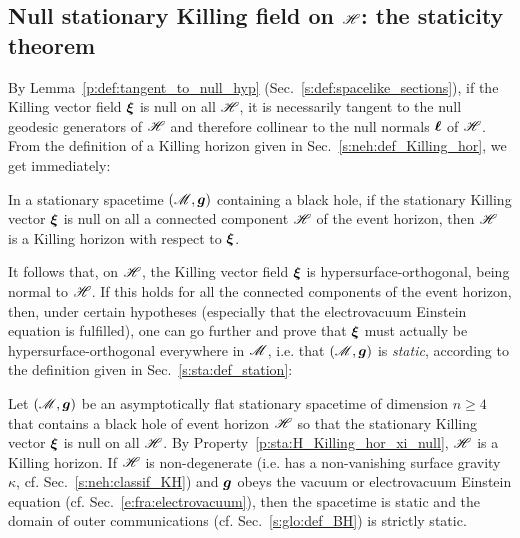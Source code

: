 \subsection{Null stationary Killing field on $\mathscr{H}$: the staticity theorem}\label{s:sta:staticity_thm}

By Lemma~\ref{p:def:tangent_to_null_hyp} (Sec.~\ref{s:def:spacelike_sections}),
if the Killing vector
field $\bm{\xi}$ is null on all $\mathscr{H}$, it is necessarily tangent to the null geodesic generators
of $\mathscr{H}$ and therefore collinear to the null normals $\bm{\ell}$ of $\mathscr{H}$. From the definition
of a Killing horizon
given in Sec.~\ref{s:neh:def_Killing_hor}, we get immediately:

\begin{prop}
\label{p:sta:H_Killing_hor_xi_null}
In a stationary spacetime $(\mathscr{M},\bm{g})$ containing a black hole,
if the stationary Killing vector $\bm{\xi}$
is null on all a connected component $\mathscr{H}$ of the event horizon, then $\mathscr{H}$ is a Killing horizon with respect to $\bm{\xi}$.
\end{prop}

It follows that, on $\mathscr{H}$, the Killing vector field $\bm{\xi}$
is hypersurface-orthogonal, being normal to $\mathscr{H}$.
If this holds for all the connected components of the event horizon, then,
under certain hypotheses (especially
that the electrovacuum Einstein equation is fulfilled), one can go further
and prove that $\bm{\xi}$ must actually be hypersurface-orthogonal everywhere in $\mathscr{M}$,
i.e. that $(\mathscr{M},\bm{g})$ is \emph{static}, according to the definition given in Sec.~\ref{s:sta:def_station}:

\begin{prop}
\label{p:sta:staticity_thm}
Let $(\mathscr{M},\bm{g})$ be an asymptotically flat stationary spacetime of dimension $n\geq 4$
that contains a black hole of event horizon $\mathscr{H}$ so that
the stationary Killing vector $\bm{\xi}$ is null on all $\mathscr{H}$. By Property~\ref{p:sta:H_Killing_hor_xi_null}, $\mathscr{H}$ is a Killing horizon. If $\mathscr{H}$ is
non-degenerate (i.e. has a non-vanishing surface gravity $\kappa$, cf. Sec.~\ref{s:neh:classif_KH})
and $\bm{g}$ obeys the vacuum or electrovacuum Einstein equation (cf. Sec.~\ref{e:fra:electrovacuum}),
then the spacetime
is static and the domain of outer communications (cf. Sec.~\ref{s:glo:def_BH}) is strictly static.
\end{prop}

